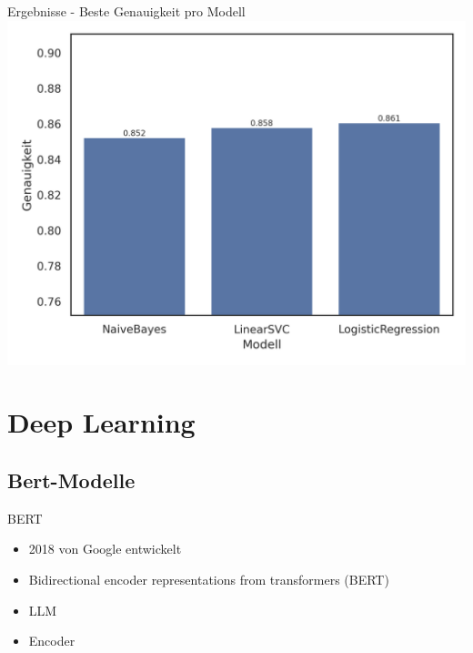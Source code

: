 \documentclass[aspectratio=169]{beamer} %
\begin{document}
\begin{frame}{Ergebnisse - Beste Genauigkeit pro Modell}
    \centering
    \includegraphics[scale=0.65]{../datasets/sentiment140/results/plots/klassische-ml-beste-genauigkeit-pro-modell-truncated-y-axis.png}
\end{frame}


\section{Deep Learning}


\subsection{Bert-Modelle}

\begin{frame}{BERT}
    \begin{itemize}
        \item 2018 von Google entwickelt
        \item Bidirectional encoder representations from transformers (BERT)
        \item LLM
        \item Encoder
    \end{itemize}
\end{frame}
\end{document}
